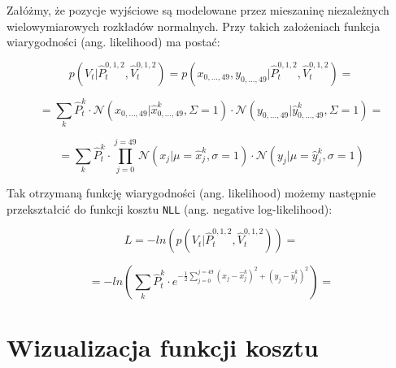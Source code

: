 \noindent
Załóżmy, że pozycje wyjściowe są modelowane przez mieszaninę niezależnych wielowymiarowych rozkładów normalnych. Przy takich założeniach funkcja wiarygodności (ang. likelihood) ma postać:

\begin{equation}
p(V_{t}|\hat{P}_{t}^{0,1,2}, \hat{V}_{t}^{0,1,2}) = p(x_{0,...,49},
y_{0,...,49}|\hat{P}_{t}^{0,1,2}, \hat{V}_{t}^{0,1,2}) =
\end{equation}

\begin{equation}
= \sum_{k}\hat{P}_{t}^{k}\cdot\mathcal{N}(x_{0,...,49}|\hat{x}_{0,...,49}^{k}, \Sigma=1)\cdot\mathcal{N}(y_{0,...,49}|\hat{y}_{0,...,49}^{k}, \Sigma=1) =
\end{equation}

\begin{equation}
= \sum_{k}\hat{P}_{t}^{k}\cdot\prod_{j=0}^{j=49}\mathcal{N}(x_{j}|\mu=\hat{x}_{j}^{k}, \sigma=1)\cdot\mathcal{N}(y_{j}|\mu=\hat{y}_{j}^{k}, \sigma=1)
\end{equation}

\noindent
Tak otrzymaną funkcję wiarygodności (ang. likelihood) możemy następnie przekształcić do funkcji kosztu \texttt{NLL} (ang. negative log-likelihood):

\begin{equation}
L = -ln(p(V_{t}|\hat{P}_{t}^{0,1,2}, \hat{V}_{t}^{0,1,2})) =
\end{equation}

\begin{equation}
= -ln(\sum_{k}\hat{P}_{t}^{k}\cdot e^{-\frac{1}{2}\sum_{j=0}^{j=49}(x_{j}-\hat{x}_{j}^{k})^{2}+(y_{j}-\hat{y}_{j}^{k})^{2}}) =
\end{equation}

\newpage

\section{Wizualizacja funkcji kosztu}

\begin{figure}[H]
    \centering
\end{figure}

